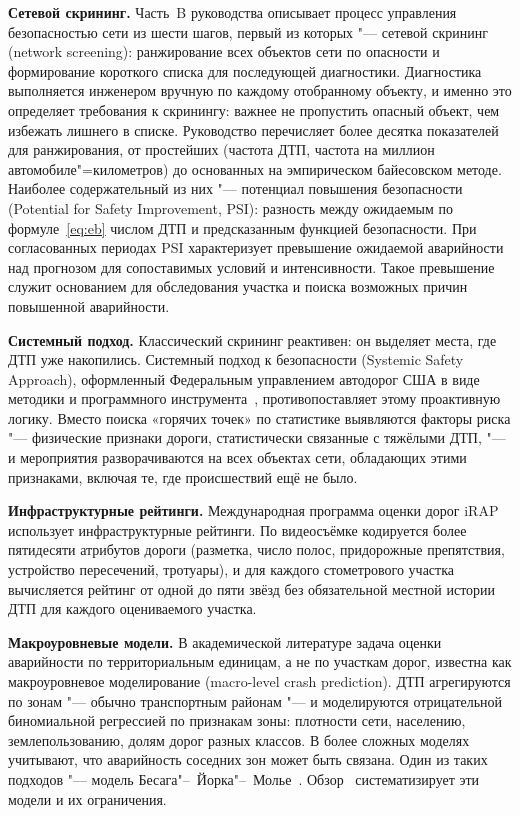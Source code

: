 \documentclass[coursework]{SCWorks}
\begin{document}
\textbf{Сетевой скрининг.} Часть~B руководства описывает процесс
управления безопасностью сети из шести шагов, первый из которых "---
сетевой скрининг (network screening): ранжирование всех объектов сети
по опасности и формирование короткого списка для последующей
диагностики. Диагностика выполняется инженером вручную по каждому
отобранному объекту, и именно это определяет требования к скринингу:
важнее не пропустить опасный объект, чем избежать лишнего в списке.
Руководство перечисляет более десятка показателей для ранжирования, от
простейших (частота ДТП, частота на миллион автомобиле"=километров) до
основанных на эмпирическом байесовском методе. Наиболее
содержательный из них "--- потенциал повышения безопасности (Potential
for Safety Improvement, PSI): разность между ожидаемым по
формуле~\eqref{eq:eb} числом ДТП и предсказанным функцией безопасности.
При согласованных периодах PSI характеризует превышение ожидаемой
аварийности над прогнозом для сопоставимых условий и интенсивности.
Такое превышение служит основанием для обследования участка и
поиска возможных причин повышенной аварийности.

\textbf{Системный подход.} Классический скрининг реактивен: он
выделяет места, где ДТП уже накопились. Системный подход к безопасности
(Systemic Safety Approach), оформленный Федеральным управлением автодорог
США в виде методики и программного инструмента~\cite{fhwa2013},
противопоставляет этому проактивную логику. Вместо поиска «горячих
точек» по статистике выявляются факторы риска "--- физические признаки
дороги, статистически связанные с тяжёлыми ДТП, "--- и мероприятия
разворачиваются на всех объектах сети, обладающих этими признаками,
включая те, где происшествий ещё не было.

\textbf{Инфраструктурные рейтинги.} Международная программа оценки
дорог iRAP~\cite{irap} использует инфраструктурные рейтинги. По видеосъёмке
кодируется более пятидесяти атрибутов дороги (разметка, число полос,
придорожные препятствия, устройство пересечений, тротуары), и для
каждого стометрового участка вычисляется рейтинг от одной до пяти
звёзд без обязательной местной истории ДТП для каждого оцениваемого
участка.

\textbf{Макроуровневые модели.} В академической литературе задача
оценки аварийности по территориальным единицам, а не по участкам дорог,
известна как макроуровневое моделирование (macro-level crash prediction).
ДТП агрегируются по зонам "--- обычно транспортным районам "--- и
моделируются отрицательной биномиальной регрессией по признакам зоны:
плотности сети, населению, землепользованию, долям дорог разных классов.
В более сложных моделях учитывают, что аварийность соседних зон может
быть связана. Один из таких подходов "--- модель
Бесага"--~Йорка"--~Молье~\cite{besag1991}. Обзор~\cite{lord2010}
систематизирует эти модели и их ограничения.
\end{document}
